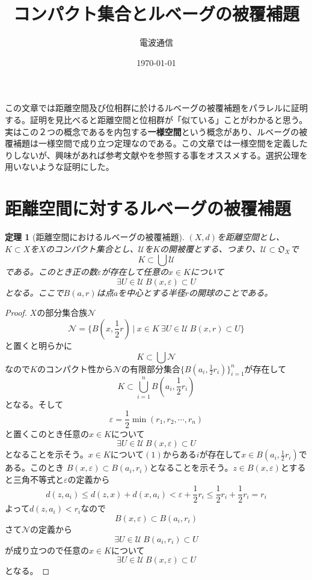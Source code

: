 \documentclass[leqno]{jsarticle}
\title{コンパクト集合とルベーグの被覆補題}
\author{電波通信}
\date{\today}
\newtheorem{thm}{定理}
\newcommand{\ep}{\varepsilon}
\begin{document}
\maketitle
この文章では距離空間及び位相群に於けるルベーグの被覆補題をパラレルに証明する。証明を見比べると距離空間と位相群が「似ている」ことがわかると思う。実はこの２つの概念であるを内包する{\bf 一様空間}という概念があり、ルベーグの被覆補題は一様空間で成り立つ定理なのである。この文章では一様空間を定義したりしないが、興味があれば参考文献\cite{2}や\cite{1}を参照する事をオススメする。選択公理を用いないような証明にした。
\section{距離空間に対するルベーグの被覆補題}
\begin{thm}[距離空間におけるルベーグの被覆補題]
$(X,d)$を距離空間とし、$K\subset X$を$X$のコンパクト集合とし、$\mathcal{U}$を$K$の開被覆とする、つまり、$\mathcal{U}\subset \mathfrak{O}_{X}$で
\[
K\subset \bigcup \mathcal{U}
\]
である。このとき正の数$\ep$が存在して任意の$x\in K$について
\[
\exists U\in \mathcal{U}\ B(x,\ep)\subset U
\]
となる。ここで$B(a,r)$は点$a$を中心とする半径$r$の開球のことである。
\end{thm}

\begin{proof}$X$の部分集合族$\mathcal{N}$
\[
\mathcal{N}=\{B(x,\frac{1}{2}r)\ |\ x\in K\ \exists U\in \mathcal{U}\ B(x,r)\subset U\}
\]
と置くと明らかに
\[
K\subset \bigcup \mathcal{N}
\]
なので$K$のコンパクト性から$\mathcal{N}$の有限部分集合$\{B(a_i,\frac{1}{2}r_i)\}_{i=1}^n$が存在して
\begin{equation}
K\subset \bigcup_{i=1}^{n}B\left(a_i,\frac{1}{2}r_i\right)
\end{equation}
となる。そして
\[
\ep=\frac{1}{2}\min(r_1,r_2,\cdots ,r_n)
\]
と置くこのとき任意の$x\in K$について
\[
\exists U\in \mathcal{U}\ B(x,\ep)\subset U
\]
となることを示そう。$x\in K$について$(1)$からある$i$が存在して$x\in B(a_i,\frac{1}{2}r_i)$である。このとき
$B(x,\ep)\subset B(a_i,r_i)$となることを示そう。$z\in B(x,\ep)$とすると三角不等式と$\ep$の定義から
\[
d(z,a_i)\le d(z,x)+d(x,a_i)<\ep+\frac{1}{2}r_i\le \frac{1}{2}r_i+\frac{1}{2}r_i=r_i
\]
よって$d(z,a_i)<r_i$なので
\[
B(x,\ep)\subset B(a_i,r_i)
\]
さて$\mathcal{N}$の定義から
\[
\exists U\in \mathcal{U}\ B(a_i,r_i)\subset U
\]
が成り立つので任意の$x\in K$について
\[
\exists U\in \mathcal{U}\ B(x,\ep)\subset U
\]
となる。
\end{proof}
\end{document}
